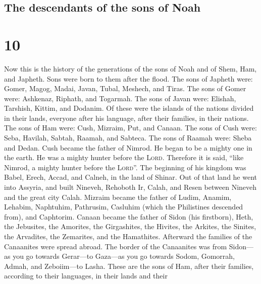 \hypertarget{the-descendants-of-the-sons-of-noah}{%
\subsection{The descendants of the sons of
Noah}\label{the-descendants-of-the-sons-of-noah}}

\hypertarget{section-9}{%
\section{10}\label{section-9}}

 Now this is the history of the generations of the sons of
Noah and of Shem, Ham, and Japheth. Sons were born to them after the
flood.  The sons of Japheth were: Gomer, Magog, Madai,
Javan, Tubal, Meshech, and Tiras.  The sons of Gomer were:
Ashkenaz, Riphath, and Togarmah.  The sons of Javan were:
Elishah, Tarshish, Kittim, and Dodanim.  Of these were the
islands of the nations divided in their lands, everyone after his
language, after their families, in their nations.  The
sons of Ham were: Cush, Mizraim, Put, and Canaan.  The
sons of Cush were: Seba, Havilah, Sabtah, Raamah, and Sabteca. The sons
of Raamah were: Sheba and Dedan.  Cush became the father
of Nimrod. He began to be a mighty one in the earth.  He
was a mighty hunter before the \textsc{Lord}. Therefore it is said,
``like Nimrod, a mighty hunter before the \textsc{Lord}''.
 The beginning of his kingdom was Babel, Erech, Accad,
and Calneh, in the land of Shinar.  Out of that land he
went into Assyria, and built Nineveh, Rehoboth Ir, Calah,
 and Resen between Nineveh and the great city Calah.
 Mizraim became the father of Ludim, Anamim, Lehabim,
Naphtuhim,  Pathrusim, Casluhim (which the Philistines
descended from), and Caphtorim.  Canaan became the father
of Sidon (his firstborn), Heth,  the Jebusites, the
Amorites, the Girgashites,  the Hivites, the Arkites, the
Sinites,  the Arvadites, the Zemarites, and the
Hamathites. Afterward the families of the Canaanites were spread abroad.
 The border of the Canaanites was from Sidon---as you go
towards Gerar---to Gaza---as you go towards Sodom, Gomorrah, Admah, and
Zeboiim---to Lasha.  These are the sons of Ham, after
their families, according to their languages, in their lands and their
